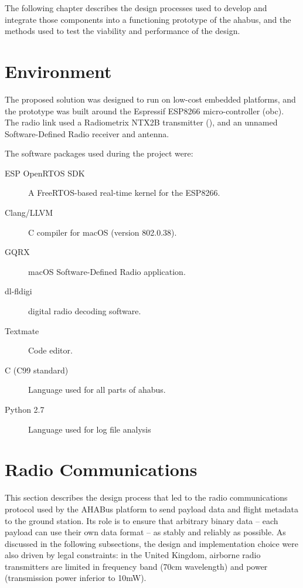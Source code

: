 The following chapter describes the design processes used to develop and
integrate those components into a functioning prototype of the
\acrfull{ahabus}, and the methods used to test the viability and performance of
the design.

\section{Environment}

The proposed solution was designed to run on low-cost embedded platforms, and
the prototype was built around the Espressif ESP8266 micro-controller
(\acrlong{obc}). The radio link used a Radiometrix NTX2B transmitter
(\cite{radiometrix2012}), and an unnamed Software-Defined Radio receiver and
antenna.

The software packages used during the project were:

\begin{description}
    
\item[ESP OpenRTOS SDK] A FreeRTOS-based real-time kernel for the ESP8266.
\item[Clang/LLVM] C compiler for macOS (version 802.0.38).
\item[GQRX] macOS Software-Defined Radio application.
\item[dl-fldigi] digital radio decoding software.
\item[Textmate] Code editor.
\item[C (C99 standard)] Language used for all parts of \acrshort{ahabus}.
\item[Python 2.7] Language used for log file analysis

\end{description}

\section{Radio Communications}
\label{sec:radio-coms}

This section describes the design process that led to the radio communications
protocol used by the AHABus platform to send payload data and flight metadata
to the ground station. Its role is to ensure that arbitrary binary data – each
payload can use their own data format – as stably and reliably as possible. As
discussed in the following subsections, the design and implementation choice
were also driven by legal constraints: in the United Kingdom, airborne radio
transmitters are limited in frequency band (70cm wavelength) and power
(transmission power inferior to 10mW).

